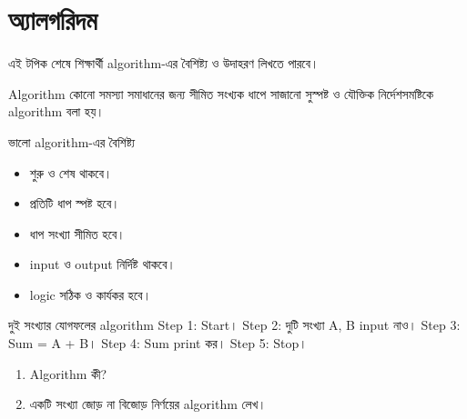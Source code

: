 \section{অ্যালগরিদম}

\begin{learningbox}
এই টপিক শেষে শিক্ষার্থী algorithm-এর বৈশিষ্ট্য ও উদাহরণ লিখতে পারবে।
\end{learningbox}

\begin{definitionbox}{Algorithm}
কোনো সমস্যা সমাধানের জন্য সীমিত সংখ্যক ধাপে সাজানো সুস্পষ্ট ও যৌক্তিক নির্দেশসমষ্টিকে algorithm বলা হয়।
\end{definitionbox}

\begin{keypointbox}{ভালো algorithm-এর বৈশিষ্ট্য}
\begin{itemize}
\item শুরু ও শেষ থাকবে।
\item প্রতিটি ধাপ স্পষ্ট হবে।
\item ধাপ সংখ্যা সীমিত হবে।
\item input ও output নির্দিষ্ট থাকবে।
\item logic সঠিক ও কার্যকর হবে।
\end{itemize}
\end{keypointbox}

\begin{examplebox}{দুই সংখ্যার যোগফলের algorithm}
Step 1: Start। Step 2: দুটি সংখ্যা A, B input নাও। Step 3: Sum = A + B। Step 4: Sum print কর। Step 5: Stop।
\end{examplebox}

\begin{practicebox}
\begin{enumerate}
\item Algorithm কী?
\item একটি সংখ্যা জোড় না বিজোড় নির্ণয়ের algorithm লেখ।
\end{enumerate}
\end{practicebox}
